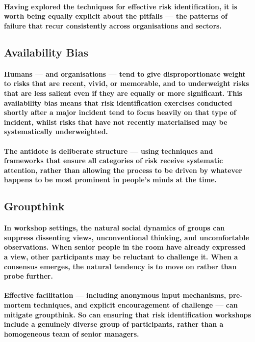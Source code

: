 \paragraph{Having explored the techniques for effective risk identification, it is worth being equally explicit about the pitfalls — the patterns of failure that recur consistently across organisations and sectors.}

\subsection{Availability Bias}
\paragraph{Humans — and organisations — tend to give disproportionate weight to risks that are recent, vivid, or memorable, and to underweight risks that are less salient even if they are equally or more significant. This \textbf{availability bias} means that risk identification exercises conducted shortly after a major incident tend to focus heavily on that type of incident, whilst risks that have not recently materialised may be systematically underweighted.}
\paragraph{The antidote is deliberate structure — using techniques and frameworks that ensure all categories of risk receive systematic attention, rather than allowing the process to be driven by whatever happens to be most prominent in people's minds at the time.}

\subsection{Groupthink}
\paragraph{In workshop settings, the natural social dynamics of groups can suppress dissenting views, unconventional thinking, and uncomfortable observations. When senior people in the room have already expressed a view, other participants may be reluctant to challenge it. When a consensus emerges, the natural tendency is to move on rather than probe further.}
\paragraph{Effective facilitation — including anonymous input mechanisms, pre-mortem techniques, and explicit encouragement of challenge — can mitigate groupthink. So can ensuring that risk identification workshops include a genuinely diverse group of participants, rather than a homogeneous team of senior managers.}

